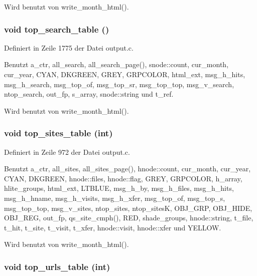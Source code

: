 Wird benutzt von write\_\-month\_\-html().
\subsubsection{\setlength{\rightskip}{0pt plus 5cm}void top\_\-search\_\-table ()}\label{output_8c_69ab2fc5b74afcb9c52ad9e0906cde88}




Definiert in Zeile 1775 der Datei output.c.

Benutzt a\_\-ctr, all\_\-search, all\_\-search\_\-page(), snode::count, cur\_\-month, cur\_\-year, CYAN, DKGREEN, GREY, GRPCOLOR, html\_\-ext, msg\_\-h\_\-hits, msg\_\-h\_\-search, msg\_\-top\_\-of, msg\_\-top\_\-sr, msg\_\-top\_\-top, msg\_\-v\_\-search, ntop\_\-search, out\_\-fp, s\_\-array, snode::string und t\_\-ref.

Wird benutzt von write\_\-month\_\-html().
\subsubsection{\setlength{\rightskip}{0pt plus 5cm}void top\_\-sites\_\-table (int)}\label{output_8c_8459026bf062636220025d736ae99fa7}




Definiert in Zeile 972 der Datei output.c.

Benutzt a\_\-ctr, all\_\-sites, all\_\-sites\_\-page(), hnode::count, cur\_\-month, cur\_\-year, CYAN, DKGREEN, hnode::files, hnode::flag, GREY, GRPCOLOR, h\_\-array, hlite\_\-groups, html\_\-ext, LTBLUE, msg\_\-h\_\-by, msg\_\-h\_\-files, msg\_\-h\_\-hits, msg\_\-h\_\-hname, msg\_\-h\_\-visits, msg\_\-h\_\-xfer, msg\_\-top\_\-of, msg\_\-top\_\-s, msg\_\-top\_\-top, msg\_\-v\_\-sites, ntop\_\-sites, ntop\_\-sites\-K, OBJ\_\-GRP, OBJ\_\-HIDE, OBJ\_\-REG, out\_\-fp, qs\_\-site\_\-cmph(), RED, shade\_\-groups, hnode::string, t\_\-file, t\_\-hit, t\_\-site, t\_\-visit, t\_\-xfer, hnode::visit, hnode::xfer und YELLOW.

Wird benutzt von write\_\-month\_\-html().
\subsubsection{\setlength{\rightskip}{0pt plus 5cm}void top\_\-urls\_\-table (int)}\label{output_8c_67742ac3286c8dd6e07650560a96e228}




